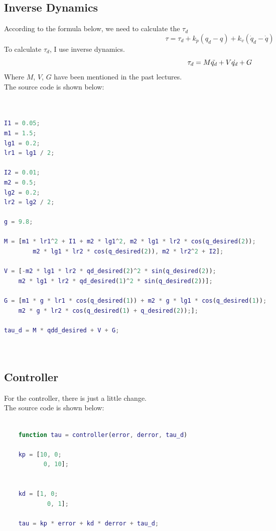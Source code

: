 \documentclass{article}
\begin{document}
\subsection*{Inverse Dynamics}
According to the formula below, we need to calculate the $\tau_d$\\
    \begin{equation}
        \tau=\tau_d+k_p(q_d-q)+k_v(\dot{q}_d-\dot{q})
    \end{equation}
To calculate $\tau_d$, I use inverse dynamics.\\ 
\begin{equation}
    \tau_d = M \Ddot{q_d} + V \dot{q_d} + G
\end{equation}
Where $M$, $V$, $G$ have been mentioned in the past lectures.\\
The source code is shown below:
\begin{lstlisting}[language=Matlab, basicstyle=\small\ttfamily]


I1 = 0.05;
m1 = 1.5;
lg1 = 0.2;
lr1 = lg1 / 2;

I2 = 0.01;
m2 = 0.5;
lg2 = 0.2;
lr2 = lg2 / 2;

g = 9.8;

M = [m1 * lr1^2 + I1 + m2 * lg1^2, m2 * lg1 * lr2 * cos(q_desired(2));
        m2 * lg1 * lr2 * cos(q_desired(2)), m2 * lr2^2 + I2];

V = [-m2 * lg1 * lr2 * qd_desired(2)^2 * sin(q_desired(2));
    m2 * lg1 * lr2 * qd_desired(1)^2 * sin(q_desired(2))];

G = [m1 * g * lr1 * cos(q_desired(1)) + m2 * g * lg1 * cos(q_desired(1));
    m2 * g * lr2 * cos(q_desired(1) + q_desired(2));];

tau_d = M * qdd_desired + V + G;

    
\end{lstlisting}

\subsection*{Controller}
For the controller, there is just a little change.\\

The source code is shown below:\\

\begin{lstlisting}[language=Matlab, basicstyle=\small\ttfamily]

    function tau = controller(error, derror, tau_d)

    kp = [10, 0;
           0, 10];


    kd = [1, 0;
            0, 1];

    tau = kp * error + kd * derror + tau_d;
\end{lstlisting}
\end{document}
